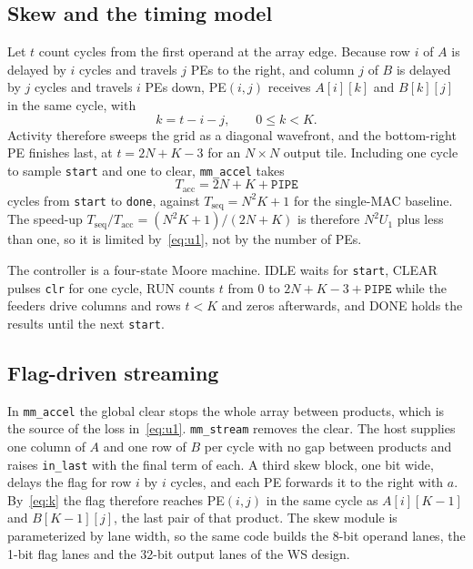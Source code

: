 \documentclass[conference]{IEEEtran}
\newcommand{\code}[1]{\texttt{#1}}
\begin{document}
\subsection{Skew and the timing model}
\label{sec:model}
Let $t$ count cycles from the first operand at the array edge. Because row $i$ of $A$ is delayed by $i$ cycles and travels $j$ PEs to the right, and column $j$ of $B$ is delayed by $j$ cycles and travels $i$ PEs down, PE$(i,j)$ receives $A[i][k]$ and $B[k][j]$ in the same cycle, with
\begin{equation}
k = t - i - j, \qquad 0 \le k < K.
\label{eq:k}
\end{equation}
Activity therefore sweeps the grid as a diagonal wavefront, and the bottom-right PE finishes last, at $t = 2N + K - 3$ for an $N\times N$ output tile. Including one cycle to sample \code{start} and one to clear, \code{mm\_accel} takes
\begin{equation}
T_{\text{acc}} = 2N + K + \mathtt{PIPE}
\label{eq:tacc}
\end{equation}
cycles from \code{start} to \code{done}, against $T_{\text{seq}} = N^2K + 1$ for the single-MAC baseline. The speed-up $T_{\text{seq}}/T_{\text{acc}} = (N^2K + 1)/(2N + K)$ is therefore $N^2 U_1$ plus less than one, so it is limited by~\eqref{eq:u1}, not by the number of PEs.

The controller is a four-state Moore machine. IDLE waits for \code{start}, CLEAR pulses \code{clr} for one cycle, RUN counts $t$ from 0 to $2N + K - 3 + \mathtt{PIPE}$ while the feeders drive columns and rows $t < K$ and zeros afterwards, and DONE holds the results until the next \code{start}.

\subsection{Flag-driven streaming}
\label{sec:stream}
In \code{mm\_accel} the global clear stops the whole array between products, which is the source of the loss in~\eqref{eq:u1}. \code{mm\_stream} removes the clear. The host supplies one column of $A$ and one row of $B$ per cycle with no gap between products and raises \code{in\_last} with the final term of each. A third skew block, one bit wide, delays the flag for row $i$ by $i$ cycles, and each PE forwards it to the right with $a$. By~\eqref{eq:k} the flag therefore reaches PE$(i,j)$ in the same cycle as $A[i][K{-}1]$ and $B[K{-}1][j]$, the last pair of that product. The skew module is parameterized by lane width, so the same code builds the 8-bit operand lanes, the 1-bit flag lanes and the 32-bit output lanes of the WS design.
\end{document}
